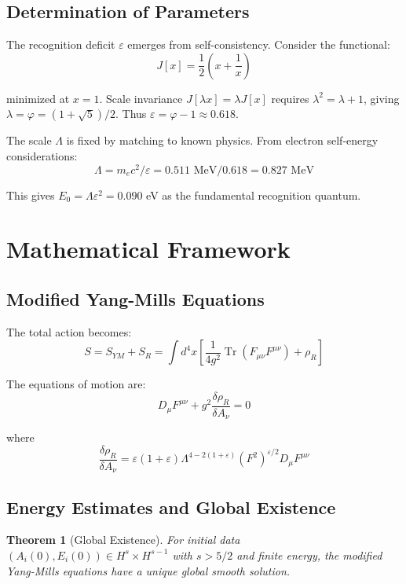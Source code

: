 \documentclass[11pt]{article}
\theoremstyle{plain}
\newtheorem{theorem}{Theorem}[section]
\theoremstyle{definition}
\theoremstyle{remark}
\newcommand{\Tr}{\operatorname{Tr}}
\begin{document}
\subsection{Determination of Parameters}

The recognition deficit $\varepsilon$ emerges from self-consistency. Consider the functional:
\[
J[x] = \frac{1}{2}\left(x + \frac{1}{x}\right)
\]

minimized at $x = 1$. Scale invariance $J[\lambda x] = \lambda J[x]$ requires $\lambda^2 = \lambda + 1$, giving $\lambda = \varphi = (1+\sqrt{5})/2$. Thus $\varepsilon = \varphi - 1 \approx 0.618$.

The scale $\Lambda$ is fixed by matching to known physics. From electron self-energy considerations:
\[
\Lambda = m_e c^2 / \varepsilon = 0.511 \text{ MeV} / 0.618 = 0.827 \text{ MeV}
\]

This gives $E_0 = \Lambda \varepsilon^2 = 0.090$ eV as the fundamental recognition quantum.

\section{Mathematical Framework}

\subsection{Modified Yang-Mills Equations}

The total action becomes:
\[
S = S_{YM} + S_R = \int d^4x \left[\frac{1}{4g^2}\Tr(F_{\mu\nu}F^{\mu\nu}) + \rho_R\right]
\]

The equations of motion are:
\[
D_\mu F^{\mu\nu} + g^2 \frac{\delta \rho_R}{\delta A_\nu} = 0
\]

where
\[
\frac{\delta \rho_R}{\delta A_\nu} = \varepsilon(1+\varepsilon)\Lambda^{4-2(1+\varepsilon)} (F^2)^{\varepsilon/2} D_\mu F^{\mu\nu}
\]

\subsection{Energy Estimates and Global Existence}

\begin{theorem}[Global Existence]
\label{thm:existence}
For initial data $(A_i(0), E_i(0)) \in H^s \times H^{s-1}$ with $s > 5/2$ and finite energy, the modified Yang-Mills equations have a unique global smooth solution.
\end{theorem}
\end{document}
